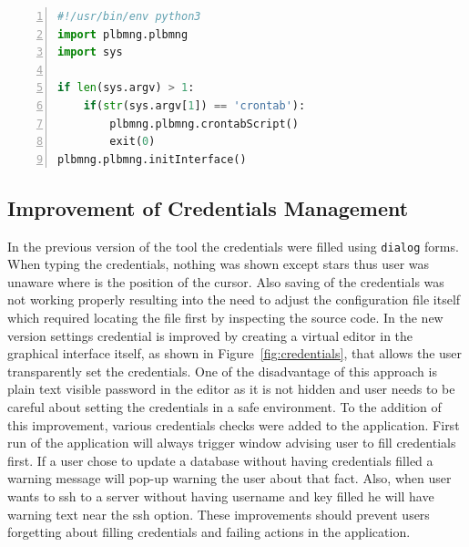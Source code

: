 {{{{{\noindent\begin{minipage}{\linewidth}
\begin{lstlisting}[language=Python, numbers=left, label={lst:plbmngbin}, caption=Source Code of Plbmng Executable Script, frame=single, showstringspaces=false, breaklines=true, keywordstyle=\color{blue},captionpos=b]
#!/usr/bin/env python3
import plbmng.plbmng
import sys

if len(sys.argv) > 1:
	if(str(sys.argv[1]) == 'crontab'):
		plbmng.plbmng.crontabScript()
		exit(0)
plbmng.plbmng.initInterface()
\end{lstlisting}
\end{minipage}}

\subsection{Improvement of Credentials Management}
In the previous version of the tool the credentials were filled using \texttt{dialog} forms. When typing the credentials, nothing was shown except stars thus user was unaware where is the position of the cursor. Also saving of the credentials was not working properly resulting into the need to adjust the configuration file itself which required locating the file first by inspecting the source code. In the new version settings credential is improved by creating a virtual editor in the graphical interface itself, as shown in Figure~\ref{fig:credentials}, that allows the user transparently set the credentials. One of the disadvantage of this approach is plain text visible password in the editor as it is not hidden and user needs to be careful about setting the credentials in a safe environment. To the addition of this improvement, various credentials checks were added to the application. First run of the application will always trigger window advising user to fill credentials first. If a user chose to update a database without having credentials filled a warning message will pop-up warning the user about that fact. Also, when user wants to ssh to a server without having username and key filled he will have warning text near the ssh option. These improvements should prevent users forgetting about filling credentials and failing actions in the application.

}}}}
